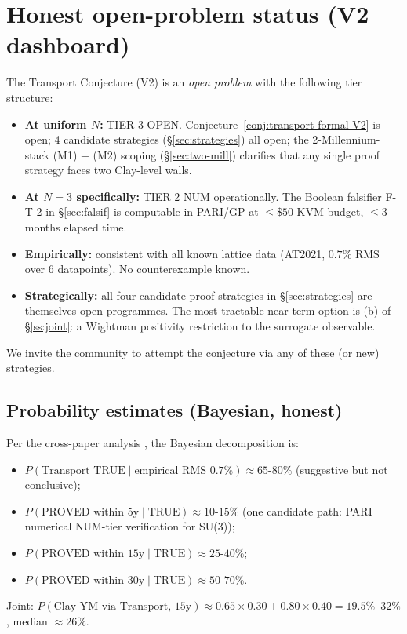 \documentclass[11pt,a4paper,reqno]{amsart}
\theoremstyle{definition}
\begin{document}
\section{Honest open-problem status (V2 dashboard)}\label{sec:status}

The Transport Conjecture (V2) is an \emph{open problem} with the following tier structure:
\begin{itemize}[leftmargin=2em]
   \item \textbf{At uniform $N$:} TIER 3 OPEN. Conjecture~\ref{conj:transport-formal-V2} is open; 4 candidate strategies (\S\ref{sec:strategies}) all open; the 2-Millennium-stack (M1) + (M2) scoping (\S\ref{sec:two-mill}) clarifies that any single proof strategy faces two Clay-level walls.
   \item \textbf{At $N=3$ specifically:} TIER 2 NUM operationally. The Boolean falsifier F-T-2 in \S\ref{sec:falsif} is computable in PARI/GP at $\leq \$50$ KVM budget, $\leq 3$ months elapsed time.
   \item \textbf{Empirically:} consistent with all known lattice data (AT2021, $0.7\%$ RMS over 6 datapoints). No counterexample known.
   \item \textbf{Strategically:} all four candidate proof strategies in \S\ref{sec:strategies} are themselves open programmes. The most tractable near-term option is (b) of \S\ref{ss:joint}: a Wightman positivity restriction to the surrogate observable.
\end{itemize}

We invite the community to attempt the conjecture via any of these (or new) strategies.

\subsection{Probability estimates (Bayesian, honest)}\label{ss:proba}

Per the cross-paper analysis \cite{Remondiere2026YMClosureV2}, the Bayesian decomposition is:
\begin{itemize}[leftmargin=2em]
  \item $P(\text{Transport TRUE} \mid \text{empirical RMS } 0.7\%) \approx 65$-$80\%$ (suggestive but not conclusive);
  \item $P(\text{PROVED within 5y} \mid \text{TRUE}) \approx 10$-$15\%$ (one candidate path: PARI numerical NUM-tier verification for SU(3));
  \item $P(\text{PROVED within 15y} \mid \text{TRUE}) \approx 25$-$40\%$;
  \item $P(\text{PROVED within 30y} \mid \text{TRUE}) \approx 50$-$70\%$.
\end{itemize}
Joint: $P(\text{Clay YM via Transport, 15y}) \approx 0.65 \times 0.30 + 0.80 \times 0.40 = 19.5\%$--$32\%$, median $\approx 26\%$.
\end{document}
